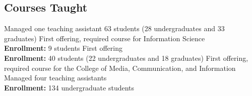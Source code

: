 \documentclass[10pt,letterpaper,final]{moderncv}
\begin{document}
\subsection{Courses Taught}
{\small Managed one teaching assistant  63 students (28 undergraduates and 33 graduates)}\vspace{6pt}
{\small First offering, required course for Information Science\\ {\textcolor{color5}{\textbf{Enrollment:}}} 9 students\vspace{6pt}}
{\small First offering\\ {\textcolor{color5}{\textbf{Enrollment:}}} 40 students (22 undergraduates and 18 graduates)}\vspace{6pt}
{First offering, required course for the College of Media, Communication, and Information \newline Managed four teaching assistants \\{\textcolor{color5}{\textbf{Enrollment:}}} 134 undergraduate students }\vspace{6pt}
\end{document}
